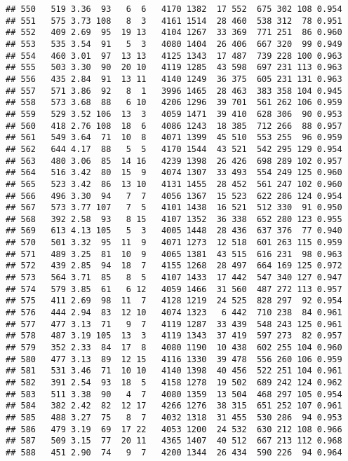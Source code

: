 \documentclass[]{article}
\begin{document}
\begin{verbatim}
## 550   519 3.36  93   6  6   4170 1382  17 552  675 302 108 0.954
## 551   575 3.73 108   8  3   4161 1514  28 460  538 312  78 0.951
## 552   409 2.69  95  19 13   4104 1267  33 369  771 251  86 0.960
## 553   535 3.54  91   5  3   4080 1404  26 406  667 320  99 0.949
## 554   460 3.01  97  13 13   4125 1343  17 487  739 228 100 0.963
## 555   503 3.30  90  20 10   4119 1285  43 598  697 231 113 0.963
## 556   435 2.84  91  13 11   4140 1249  36 375  605 231 131 0.963
## 557   571 3.86  92   8  1   3996 1465  28 463  383 358 104 0.945
## 558   573 3.68  88   6 10   4206 1296  39 701  561 262 106 0.959
## 559   529 3.52 106  13  3   4059 1471  39 410  628 306  90 0.953
## 560   418 2.76 108  18  6   4086 1243  18 385  712 266  88 0.957
## 561   549 3.64  71  10  8   4071 1399  45 510  553 255  96 0.959
## 562   644 4.17  88   5  5   4170 1544  43 521  542 295 129 0.954
## 563   480 3.06  85  14 16   4239 1398  26 426  698 289 102 0.957
## 564   516 3.42  80  15  9   4074 1307  33 493  554 249 125 0.960
## 565   523 3.42  86  13 10   4131 1455  28 452  561 247 102 0.960
## 566   496 3.30  94   7  7   4056 1367  15 523  622 286 124 0.954
## 567   573 3.77 107   7  5   4101 1438  16 521  512 330  91 0.950
## 568   392 2.58  93   8 15   4107 1352  36 338  652 280 123 0.955
## 569   613 4.13 105   5  3   4005 1448  28 436  637 376  77 0.940
## 570   501 3.32  95  11  9   4071 1273  12 518  601 263 115 0.959
## 571   489 3.25  81  10  9   4065 1381  43 515  616 231  98 0.963
## 572   439 2.85  94  18  7   4155 1268  28 497  664 169 125 0.972
## 573   564 3.71  85   8  5   4107 1433  17 442  547 340 127 0.947
## 574   579 3.85  61   6 12   4059 1466  31 560  487 272 113 0.957
## 575   411 2.69  98  11  7   4128 1219  24 525  828 297  92 0.954
## 576   444 2.94  83  12 10   4074 1323   6 442  710 238  84 0.961
## 577   477 3.13  71   9  7   4119 1287  33 439  548 243 125 0.961
## 578   487 3.19 105  13  3   4119 1343  37 419  597 273  82 0.957
## 579   352 2.33  84  17  8   4080 1190  10 438  602 255 104 0.960
## 580   477 3.13  89  12 15   4116 1330  39 478  556 260 106 0.959
## 581   531 3.46  71  10 10   4140 1398  40 456  522 251 104 0.961
## 582   391 2.54  93  18  5   4158 1278  19 502  689 242 124 0.962
## 583   511 3.38  90   4  7   4080 1359  13 504  468 297 105 0.954
## 584   382 2.42  82  12 17   4266 1276  38 315  651 252 107 0.961
## 585   488 3.27  75   8  7   4032 1318  31 455  530 286  94 0.953
## 586   479 3.19  69  17 22   4053 1200  24 532  630 212 108 0.966
## 587   509 3.15  77  20 11   4365 1407  40 512  667 213 112 0.968
## 588   451 2.90  74   9  7   4200 1344  26 434  590 226  94 0.964

\end{verbatim}
\end{document}
